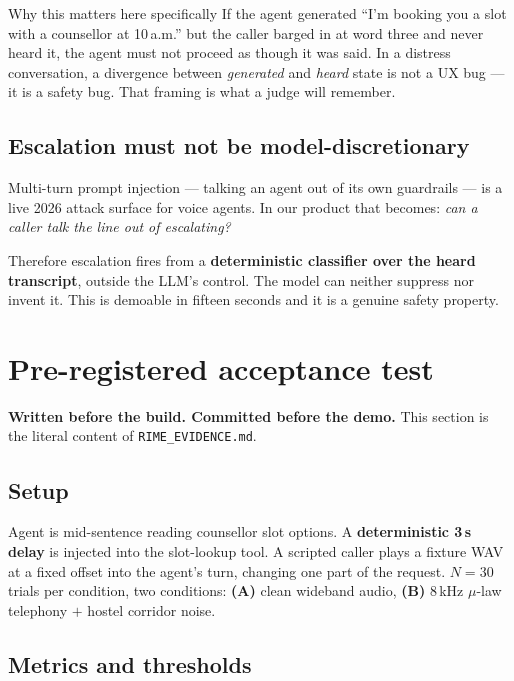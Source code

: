\documentclass[11pt,a4paper]{article}
\newcommand{\code}[1]{\texttt{\small #1}}
\begin{document}
\begin{keybox}{Why this matters here specifically}
If the agent generated ``I'm booking you a slot with a counsellor at 10\,a.m.'' but the
caller barged in at word three and never heard it, the agent must not proceed as though
it was said. In a distress conversation, a divergence between \emph{generated} and
\emph{heard} state is not a UX bug --- it is a safety bug. That framing is what a judge
will remember.
\end{keybox}

\subsection{Escalation must not be model-discretionary}

Multi-turn prompt injection --- talking an agent out of its own guardrails --- is a live
2026 attack surface for voice agents. In our product that becomes: \emph{can a caller
talk the line out of escalating?}

Therefore escalation fires from a \textbf{deterministic classifier over the heard
transcript}, outside the LLM's control. The model can neither suppress nor invent it.
This is demoable in fifteen seconds and it is a genuine safety property.

\section{Pre-registered acceptance test}
\label{sec:test}

\textbf{Written before the build. Committed before the demo.} This section is the
literal content of \code{RIME\_EVIDENCE.md}.

\subsection{Setup}

Agent is mid-sentence reading counsellor slot options. A \textbf{deterministic 3\,s delay}
is injected into the slot-lookup tool. A scripted caller plays a fixture WAV at a fixed
offset into the agent's turn, changing one part of the request. $N = 30$ trials per
condition, two conditions: \textbf{(A)} clean wideband audio,
\textbf{(B)} 8\,kHz $\mu$-law telephony $+$ hostel corridor noise.

\subsection{Metrics and thresholds}
\end{document}
